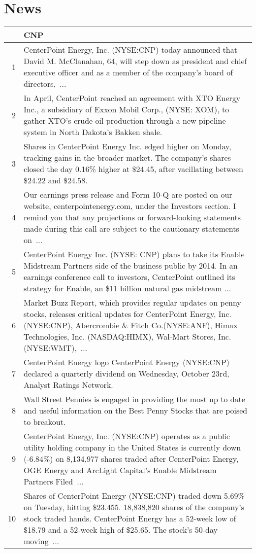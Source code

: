 \documentclass{tufte-handout}\usepackage[]{graphicx}\usepackage[]{color}
\begin{document}
\newpage
\section{News}


\begin{tabularx}{\textwidth}{rX}
  \hline
 & CNP \\ 
  \hline
1 &  CenterPoint Energy, Inc. (NYSE:CNP) today announced that David M. McClanahan, 64, will step down as president and chief executive officer and as a member of the company's board of directors, ...  \\ 
  2 &  In April, CenterPoint reached an agreement with XTO Energy Inc., a subsidiary of Exxon Mobil Corp., (NYSE: XOM), to gather XTO's crude oil production through a new pipeline system in North Dakota's Bakken shale.  \\ 
  3 &  Shares in CenterPoint Energy Inc. edged higher on Monday, tracking gains in the broader market. The company's shares closed the day 0.16\% higher at \$24.45, after vacillating between \$24.22 and \$24.58.  \\ 
  4 &  Our earnings press release and Form 10-Q are posted on our website, centerpointenergy.com, under the Investors section. I remind you that any projections or forward-looking statements made during this call are subject to the cautionary statements on ...  \\ 
  5 &  CenterPoint Energy Inc. (NYSE: CNP) plans to take its Enable Midstream Partners side of the business public by 2014. In an earnings conference call to investors, CenterPoint outlined its strategy for Enable, an \$11 billion natural gas midstream ...  \\ 
  6 &  Market Buzz Report, which provides regular updates on penny stocks, releases critical updates for CenterPoint Energy, Inc.(NYSE:CNP), Abercrombie \& Fitch Co.(NYSE:ANF), Himax Technologies, Inc. (NASDAQ:HIMX), Wal-Mart Stores, Inc.(NYSE:WMT), ...  \\ 
  7 &  CenterPoint Energy logo CenterPoint Energy (NYSE:CNP) declared a quarterly dividend on Wednesday, October 23rd, Analyst Ratings Network.  \\ 
  8 &  Wall Street Pennies is engaged in providing the most up to date and useful information on the Best Penny Stocks that are poised to breakout.  \\ 
  9 &  CenterPoint Energy, Inc. (NYSE:CNP) operates as a public utility holding company in the United States is currently down (-6.84\%) on 8,134,977 shares traded after CenterPoint Energy, OGE Energy and ArcLight Capital's Enable Midstream Partners Filed ...  \\ 
  10 &  Shares of CenterPoint Energy (NYSE:CNP) traded down 5.69\% on Tuesday, hitting \$23.455. 18,838,820 shares of the company's stock traded hands. CenterPoint Energy has a 52-week low of \$18.79 and a 52-week high of \$25.65. The stock's 50-day moving ...  \\ 
   \hline
\end{tabularx}
\end{document}
